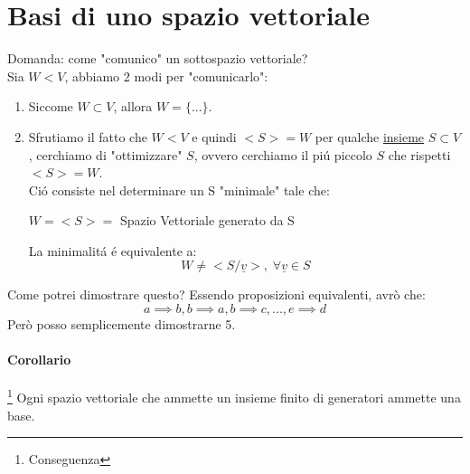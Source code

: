 
\section{Basi di uno spazio vettoriale}
Domanda: come "comunico" un sottospazio vettoriale?
\\Sia $W<V$, abbiamo 2 modi per "comunicarlo":
\begin{enumerate}
    \item Siccome $W\subset V$, allora $W=\{...\}$.
    \item Sfrutiamo il fatto che $W<V$ e quindi $<S>=W$ per qualche \underline{insieme} $S\subset V$,
    cerchiamo di "ottimizzare" $S$, ovvero cerchiamo il piú piccolo $S$ che rispetti $<S>=W$.
    \\Ció consiste nel determinare un S "minimale" tale che:
    \begin{center}
        $W = <S> =$ Spazio Vettoriale generato da S
    \end{center}
    La minimalitá é equivalente a:
    \[ W\neq <S/\underline{v}>, \; \forall \underline{v} \in S \]
\end{enumerate}

Come potrei dimostrare questo?
Essendo proposizioni equivalenti, avrò che:
\[ a \implies b, b\implies a, b \implies c, ... , e\implies d\]
Però posso semplicemente dimostrarne 5. %
\paragraph{Corollario}\footnote{Conseguenza} Ogni spazio vettoriale che ammette un insieme finito di generatori ammette una base.

